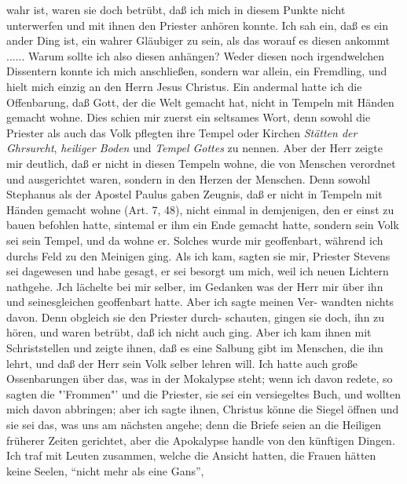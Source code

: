 wahr ist, waren sie doch betrübt, daß ich mich in diesem Punkte
nicht unterwerfen und mit ihnen den Priester anhören konnte.
Ich sah ein, daß es ein ander Ding ist, ein wahrer Gläubiger
zu sein, als das worauf es diesen ankommt ...... Warum sollte
ich also diesen anhängen? Weder diesen noch irgendwelchen
Dissentern konnte ich mich anschließen, sondern war allein, ein
Fremdling, und hielt mich einzig an den Herrn Jesus Christus.
Ein andermal hatte ich die Offenbarung, daß Gott, der die
Welt gemacht hat, nicht in Tempeln mit Händen gemacht wohne.
Dies schien mir zuerst ein seltsames Wort, denn sowohl die
Priester als auch das Volk pflegten ihre Tempel oder Kirchen
\textit{Stätten der Ghrsurcht}, \textit{heiliger Boden} und \textit{Tempel Gottes}
zu nennen. Aber der Herr zeigte mir deutlich, daß er nicht
in diesen Tempeln wohne, die von Menschen verordnet und
ausgerichtet waren, sondern in den Herzen der Menschen. Denn
sowohl Stephanus als der Apostel Paulus gaben Zeugnis,
daß er nicht in Tempeln mit Händen gemacht wohne (Art. 7, 48),
nicht einmal in demjenigen, den er einst zu bauen befohlen hatte,
sintemal er ihm ein Ende gemacht hatte, sondern sein Volk sei
sein Tempel, und da wohne er. Solches wurde mir geoffenbart,
während ich durchs Feld zu den Meinigen ging. Als ich kam,
sagten sie mir, Priester Stevens sei dagewesen und habe gesagt,
er sei besorgt um mich, weil ich neuen Lichtern nathgehe. Jch
lächelte bei mir selber, im Gedanken was der Herr mir über ihn
und seinesgleichen geoffenbart hatte. Aber ich sagte meinen Ver-
wandten nichts davon. Denn obgleich sie den Priester durch-
schauten, gingen sie doch, ihn zu hören, und waren betrübt, daß
ich nicht auch ging. Aber ich kam ihnen mit Schriststellen und
zeigte ihnen, daß es eine Salbung gibt im Menschen, die ihn
lehrt, und daß der Herr sein Volk selber lehren will. Ich hatte
auch große Ossenbarungen über das, was in der Mokalypse steht;
wenn ich davon redete, so sagten die "'Frommen"' und die Priester,
sie sei ein versiegeltes Buch, und wollten mich davon abbringen;
aber ich sagte ihnen, Christus könne die Siegel öffnen und sie
sei das, was uns am nächsten angehe; denn die Briefe seien an
die Heiligen früherer Zeiten gerichtet, aber die Apokalypse handle
von den künftigen Dingen.
Ich traf mit Leuten zusammen, welche die Ansicht hatten,
die Frauen hätten keine Seelen, "`nicht mehr als eine Gans"',




